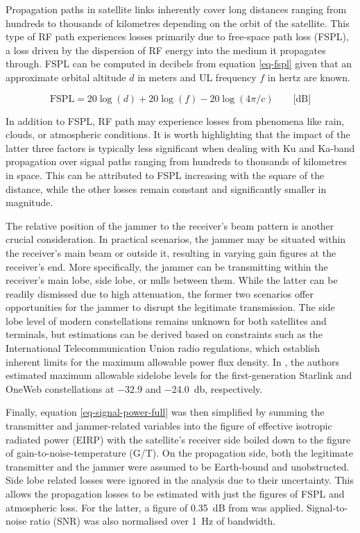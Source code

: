 \documentclass[english, 12pt, a4paper, elec, utf8, a-1b, online]{aaltothesis}
\begin{document}
Propagation paths in satellite links inherently cover long distances ranging from hundreds to thousands of kilometres depending on the orbit of the satellite.
This type of RF path experiences losses primarily due to free-space path loss (FSPL), a loss driven by the dispersion of RF energy into the medium it propagates through.
FSPL can be computed in decibels from equation \ref{eq-fspl} given that an approximate orbital altitude $d$ in meters and UL frequency $f$ in hertz are known.

\begin{equation} \label{eq-fspl}
  \mathrm{FSPL} = 20\log(d)+20\log(f)-20\log(4\pi / c) \qquad \text{[dB]}
\end{equation}

In addition to FSPL, RF path may experience losses from phenomena like rain, clouds, or atmospheric conditions.
It is worth highlighting that the impact of the latter three factors is typically less significant when dealing with Ku and Ka-band propagation over signal paths ranging from hundreds to thousands of kilometres in space.
This can be attributed to FSPL increasing with the square of the distance, while the other losses remain constant and significantly smaller in magnitude.

The relative position of the jammer to the receiver's beam pattern is another crucial consideration.
In practical scenarios, the jammer may be situated within the receiver's main beam or outside it, resulting in varying gain figures at the receiver's end. More specifically, the jammer can be transmitting within the receiver's main lobe, side lobe, or nulls between them.
While the latter can be readily dismissed due to high attenuation, the former two scenarios offer opportunities for the jammer to disrupt the legitimate transmission.
The side lobe level of modern constellations remains unknown for both satellites and terminals, but estimations can be derived based on constraints such as the International Telecommunication Union radio regulations, which establish inherent limits for the maximum allowable power flux density.
In \cite{hills2023controlling}, the authors estimated maximum allowable sidelobe levels for the first-generation Starlink and OneWeb constellations at $-32.9$ and \qty{-24.0}{\decibel}, respectively. 

Finally, equation \ref{eq-signal-power-full} was then simplified by summing the transmitter and jammer-related variables into the figure of effective isotropic radiated power (EIRP) with the satellite's receiver side boiled down to the figure of gain-to-noise-temperature (G/T).
On the propagation side, both the legitimate transmitter and the jammer were assumed to be Earth-bound and unobstructed.
Side lobe related losses were ignored in the analysis due to their uncertainty.
This allows the propagation losses to be estimated with just the figures of FSPL and atmospheric loss.
For the latter, a figure of \SI{0.35}{\deci\bel} from \cite{kymeta2019link} was applied. Signal-to-noise ratio (SNR) was also normalised over \SI{1}{\hertz} of bandwidth.
\end{document}
